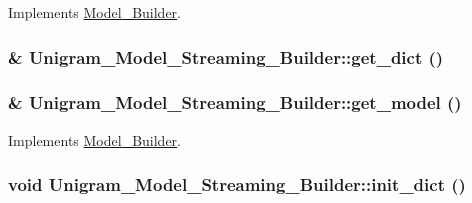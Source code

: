 Implements \hyperlink{class_model___builder_a6818803bf65009076dd09dcd9bb9a0b8}{Model\_\-Builder}.

\hypertarget{class_unigram___model___streaming___builder_a5f29e8eaf012c9112c69155cb50a11da}{
\subsubsection[{get\_\-dict}]{ \& Unigram\_\-Model\_\-Streaming\_\-Builder::get\_\-dict ()}}
\label{class_unigram___model___streaming___builder_a5f29e8eaf012c9112c69155cb50a11da}
\hypertarget{class_unigram___model___streaming___builder_a9afdd36c7ece8fa1ad87fa1b3f898d20}{
\subsubsection[{get\_\-model}]{ \& Unigram\_\-Model\_\-Streaming\_\-Builder::get\_\-model ()}}
\label{class_unigram___model___streaming___builder_a9afdd36c7ece8fa1ad87fa1b3f898d20}


Implements \hyperlink{class_model___builder_a2cd7a2ce64bdc1377f6deee168e1bcd2}{Model\_\-Builder}.

\hypertarget{class_unigram___model___streaming___builder_adeef20b390c1f3801a6dfec0b297caee}{
\subsubsection[{init\_\-dict}]{\setlength{\rightskip}{0pt plus 5cm}void Unigram\_\-Model\_\-Streaming\_\-Builder::init\_\-dict ()}}
\label{class_unigram___model___streaming___builder_adeef20b390c1f3801a6dfec0b297caee}


